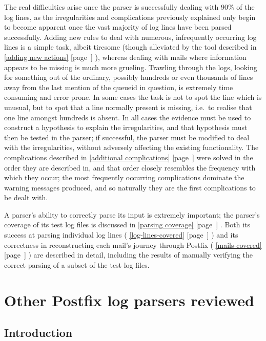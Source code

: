 \documentclass[a4paper,12pt,draft]{article}
\newcommand{\refwithpage}[1]{%
    \empty{}\ref{#1} [page~\pageref{#1}]%
}
\newcommand{\sectionref}[1]{%
    \textsection{}\refwithpage{#1}%
}
\begin{document}
The real difficulties arise once the parser is successfully dealing with
90\% of the log lines, as the irregularities and complications previously
explained only begin to become apparent once the vast majority of log lines
have been parsed successfully.  Adding new rules to deal with numerous,
infrequently occurring log lines is a simple task, albeit tiresome (though
alleviated by the tool described in \sectionref{adding new actions}),
whereas dealing with mails where information appears to be missing is much
more grueling.  Trawling through the logs, looking for something out of the
ordinary, possibly hundreds or even thousands of lines away from the last
mention of the queueid in question, is extremely time consuming and error
prone.  In some cases the task is not to spot the line which is unusual,
but to spot that a line normally present is missing, i.e.\ to realise that
one line amongst hundreds is absent.  In all cases the evidence must be
used to construct a hypothesis to explain the irregularities, and that
hypothesis must then be tested in the parser; if successful, the parser
must be modified to deal with the irregularities, without adversely
affecting the existing functionality.  The complications described in
\sectionref{additional complications} were solved in the order they are
described in, and that order closely resembles the frequency with which
they occur; the most frequently occurring complications dominate the
warning messages produced, and so naturally they are the first
complications to be dealt with.

A parser's ability to correctly parse its input is extremely important; the
parser's coverage of its test log files is discussed in \sectionref{parsing
coverage}.  Both its success at parsing individual log lines
(\sectionref{log-lines-covered}) and its correctness in reconstructing each
mail's journey through Postfix (\sectionref{mails-covered}) are described
in detail, including the results of manually verifying the correct parsing
of a subset of the test log files.

\newpage

\appendix


\section{Other Postfix log parsers reviewed}

\label{other-parsers}

\subsection{Introduction}
\end{document}
